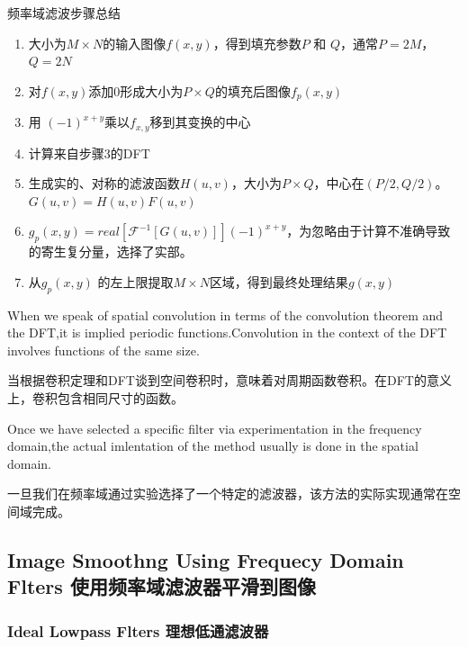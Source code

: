 \documentclass[12pt]{article}
\numberwithin{equation}{section}%
\begin{document}
\begin{description}
\item [频率域滤波步骤总结]
\end{description}

\begin{enumerate}
\item 大小为$M\times N$的输入图像$f(x,y)$，得到填充参数$P$ 和 $Q$，通常$P=2M$，$Q=2N$  

\item 对$f(x,y)$添加0形成大小为$P\times Q$的填充后图像$f_{p}(x,y)$

\item 用 $(-1)^{x+y}$乘以$f_{x,y}$移到其变换的中心

\item 计算来自步骤3的DFT

\item 生成实的、对称的滤波函数$H(u,v)$，大小为$P\times Q$，中心在$(P/2,Q/2)$。$G(u,v)=H(u,v)F(u,v)$

\item $g_{p}(x,y)={real[\mathscr{F}^{-1}[G(u,v)]]}(-1)^{x+y}$，为忽略由于计算不准确导致的寄生复分量，选择了实部。

\item 从$g_{p}(x,y)$ 的左上限提取$M\times N$区域，得到最终处理结果$g(x,y)$

\end{enumerate}

When we speak of spatial convolution in terms of the convolution theorem and the DFT,it is implied periodic functions.Convolution in the context of the DFT involves functions of the same size.

当根据卷积定理和DFT谈到空间卷积时，意味着对周期函数卷积。在DFT的意义上，卷积包含相同尺寸的函数。

Once we have selected a specific filter via experimentation in the frequency domain,the actual imlentation of the method usually is done in the spatial domain.

一旦我们在频率域通过实验选择了一个特定的滤波器，该方法的实际实现通常在空间域完成。

\subsection{Image Smoothng Using Frequecy Domain Flters 使用频率域滤波器平滑到图像}

\subsubsection{Ideal Lowpass Flters 理想低通滤波器}
\end{document}
